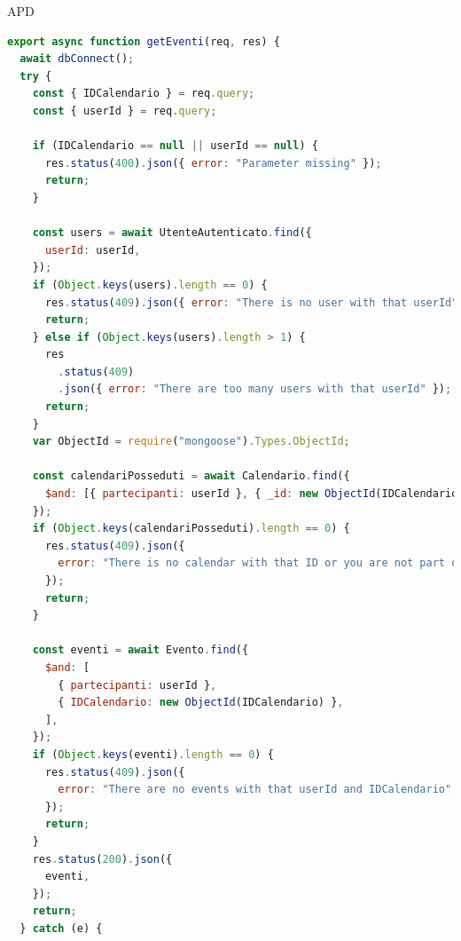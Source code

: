 \begin{listaPersonale} {APD}
\begin{listaPersonale2}[APD]{}

                \begin{lstlisting}[language=JavaScript]
export async function getEventi(req, res) {
  await dbConnect();
  try {
    const { IDCalendario } = req.query;
    const { userId } = req.query;

    if (IDCalendario == null || userId == null) {
      res.status(400).json({ error: "Parameter missing" });
      return;
    }

    const users = await UtenteAutenticato.find({
      userId: userId,
    });
    if (Object.keys(users).length == 0) {
      res.status(409).json({ error: "There is no user with that userId" });
      return;
    } else if (Object.keys(users).length > 1) {
      res
        .status(409)
        .json({ error: "There are too many users with that userId" });
      return;
    }
    var ObjectId = require("mongoose").Types.ObjectId;

    const calendariPosseduti = await Calendario.find({
      $and: [{ partecipanti: userId }, { _id: new ObjectId(IDCalendario) }],
    });
    if (Object.keys(calendariPosseduti).length == 0) {
      res.status(409).json({
        error: "There is no calendar with that ID or you are not part of it",
      });
      return;
    }

    const eventi = await Evento.find({
      $and: [
        { partecipanti: userId },
        { IDCalendario: new ObjectId(IDCalendario) },
      ],
    });
    if (Object.keys(eventi).length == 0) {
      res.status(409).json({
        error: "There are no events with that userId and IDCalendario",
      });
      return;
    }
    res.status(200).json({
      eventi,
    });
    return;
  } catch (e) {
    

\end{lstlisting}
\end{listaPersonale2}
\end{listaPersonale}
